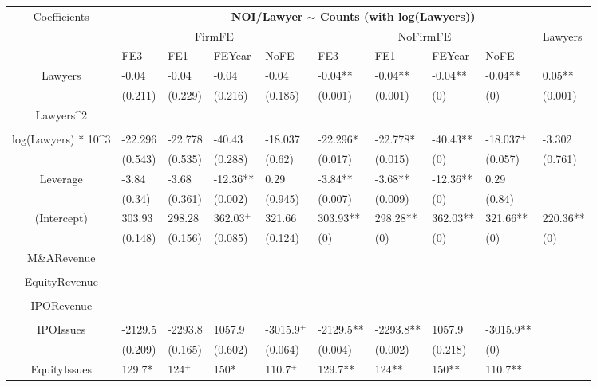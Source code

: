 \documentclass{article}
\begin{document}
\begin{table}[H]
\centering
\begin{tabular}{|clllllllll|}
\hline
\multirow{3}{*}{Coefficients} & \multicolumn{9}{c|}{\textbf{NOI/Lawyer $\sim$ Counts (with log(Lawyers))}} \\
\cline{2-10}
& \multicolumn{4}{c}{FirmFE} & \multicolumn{4}{c}{NoFirmFE} & \multirow{2}{*}{Lawyers} \\
\cline{2-9}
& FE3 & FE1 & FEYear & NoFE & FE3 & FE1 & FEYear & NoFE &  \\
\hline
 
Lawyers & -0.04 & -0.04 & -0.04 & -0.04 & -0.04** & -0.04** & -0.04** & -0.04** & 0.05** \\ 
   & (0.211) & (0.229) & (0.216) & (0.185) & (0.001) & (0.001) & (0) & (0) & (0.001) \\ 
  Lawyers^2 &  &  &  &  &  &  &  &  &  \\ 
   &  &  &  &  &  &  &  &  &  \\ 
  log(Lawyers) * 10^3 & -22.296 & -22.778 & -40.43 & -18.037 & -22.296* & -22.778* & -40.43** & -18.037$^{+}$ & -3.302 \\ 
   & (0.543) & (0.535) & (0.288) & (0.62) & (0.017) & (0.015) & (0) & (0.057) & (0.761) \\ 
  Leverage & -3.84 & -3.68 & -12.36** & 0.29 & -3.84** & -3.68** & -12.36** & 0.29 &  \\ 
   & (0.34) & (0.361) & (0.002) & (0.945) & (0.007) & (0.009) & (0) & (0.84) &  \\ 
  (Intercept) & 303.93 & 298.28 & 362.03$^{+}$ & 321.66 & 303.93** & 298.28** & 362.03** & 321.66** & 220.36** \\ 
   & (0.148) & (0.156) & (0.085) & (0.124) & (0) & (0) & (0) & (0) & (0) \\ 
  M\&ARevenue &  &  &  &  &  &  &  &  &  \\ 
   &  &  &  &  &  &  &  &  &  \\ 
  EquityRevenue &  &  &  &  &  &  &  &  &  \\ 
   &  &  &  &  &  &  &  &  &  \\ 
  IPORevenue &  &  &  &  &  &  &  &  &  \\ 
   &  &  &  &  &  &  &  &  &  \\ 
  IPOIssues & -2129.5 & -2293.8 & 1057.9 & -3015.9$^{+}$ & -2129.5** & -2293.8** & 1057.9 & -3015.9** &  \\ 
   & (0.209) & (0.165) & (0.602) & (0.064) & (0.004) & (0.002) & (0.218) & (0) &  \\ 
  EquityIssues & 129.7* & 124$^{+}$ & 150* & 110.7$^{+}$ & 129.7** & 124** & 150** & 110.7** &  \\ 

\end{tabular}
\end{table}
\end{document}
